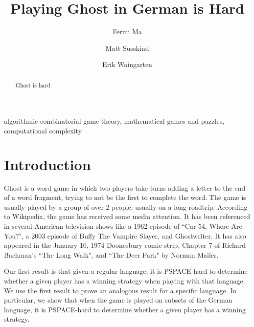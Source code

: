 \documentclass[runningheads,a4paper]{llncs}
\newcommand{\keywords}[1]{\par\addvspace\baselineskip
\noindent\keywordname\enspace\ignorespaces#1}
\begin{document}
\mainmatter  

\title{Playing Ghost in German is Hard}


\author{Fermi Ma
\and Matt Susskind \and Erik Waingarten}
%


%
%

\maketitle


\begin{abstract}
Ghost is hard
\end{abstract}

\keywords{algorithmic combinatorial game theory, mathematical games and puzzles, computational complexity}

\section{Introduction}

	Ghost is a word game in which two players take turns adding a letter to the end of a word fragment, trying to not be the first to complete the word. The game is usually played by a group of over 2 people, usually on a long roadtrip. According to Wikipedia, the game has received some media attention. It has been referenced in several American television shows like a 1962 episode of ``Car 54, Where Are You?", a 2003 episode of Buffy The Vampire Slayer, and Ghostwriter. It has also appeared in the January 10, 1974 Doonesbury comic strip, Chapter 7 of Richard Bachman's ``The Long Walk", and ``The Deer Park" by Norman Mailer.

	Our first result is that given a regular language, it is PSPACE-hard to determine whether a given player has a winning strategy when playing with that language. We use the first result to prove an analogous result for a specific language. In particular, we show that when the game is played on subsets of the German language, it is PSPACE-hard to determine whether a given player has a winning strategy.
\end{document}
